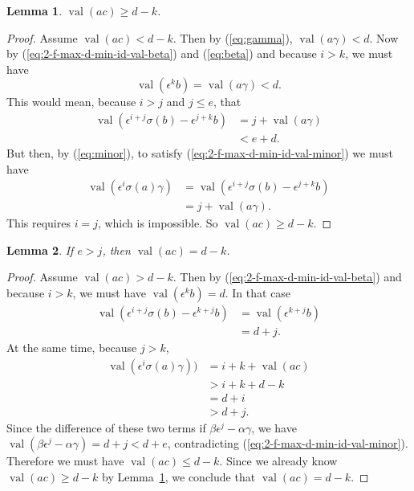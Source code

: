 \documentclass{amsart}
\newtheorem{lemma}{Lemma}[subsection]
\theoremstyle{definition}
\def\e{\epsilon}
\def\val{\mathop{\mathrm{val}}}
\def\s{\sigma}
\begin{document}
  \begin{lemma}
    \label{lemma:2-f-max-d-min-id-val-ac}
    $\val(ac) \ge d - k$.
  \end{lemma}
  \begin{proof}
    Assume $\val(ac) < d - k$.  Then by (\ref{eq:gamma}), $\val(a\gamma) < d$.
    Now by (\ref{eq:2-f-max-d-min-id-val-beta}) and (\ref{eq:beta}) and because
    $i > k$, we must have
    \begin{equation*}
      \val(\e^k b) = \val(a\gamma) < d.
    \end{equation*}
    This would mean, because $i > j$ and $j \le e$, that
    \begin{align*}
      \val(\e^{i+j}\s(b) - \e^{j+k}b) &= j + \val(a\gamma) \\
      &< e + d.
    \end{align*}
    But then, by (\ref{eq:minor}), to satisfy
    (\ref{eq:2-f-max-d-min-id-val-minor}) we must have
    \begin{align*}
      \val(\e^i\s(a)\gamma) &= \val(\e^{i+j}\s(b) - \e^{j+k}b) \\
      & = j + \val(a\gamma).
    \end{align*}
    This requires $i = j$, which is impossible.  So $\val(ac) \ge d-k$.
  \end{proof}

  \begin{lemma}
    \label{lemma:2-f-max-d-min-id-e-g-j-val-ac}
    If $e > j$, then $\val(ac) = d - k$.
  \end{lemma}
  \begin{proof}
    Assume $\val(ac) > d - k$.  Then by (\ref{eq:2-f-max-d-min-id-val-beta}) and
    because $i > k$, we must have $\val(\e^k b) = d$.  In that case
    \begin{align*}
      \val(\e^{i+j}\s(b) - \e^{k+j}b) &= \val(\e^{k+j}b) \\
      &= d + j.
    \end{align*}
    At the same time, because $j > k$,
    \begin{align*}
      \val(\e^i \s(a) \gamma)) &= i + k + \val(ac) \\
      &> i + k + d - k \\
      &= d + i \\
      &> d + j.
    \end{align*}
    Since the difference of these two terms if $\beta\e^j - \alpha\gamma$, we
    have $\val(\beta\e^j - \alpha\gamma) = d + j < d + e$, contradicting
    (\ref{eq:2-f-max-d-min-id-val-minor}).  Therefore we must have $\val(ac)
    \le d - k$.  Since we already know $\val(ac) \ge d-k$ by
    Lemma~\ref{lemma:2-f-max-d-min-id-val-ac}, we conclude that $\val(ac) = d -
    k$.
  \end{proof}
\end{document}
